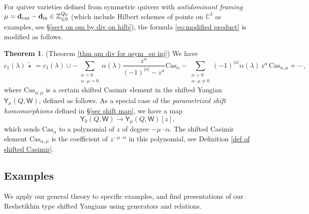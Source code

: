 \documentclass[10pt]{amsart}
\theoremstyle{definition}
\newtheorem{Theorem}{Theorem}[section]
\numberwithin{equation}{section}
\newcommand{\C}{\mathbb{C}}
\newcommand{\bZ}{\mathbb{Z}}
\newcommand{\sW}{\mathsf{W}}
\begin{document}
For quiver varieties defined from symmetric quivers with \textit{antidominant framing} 
$\mu =\mathbf{d}_\textup{out} - \mathbf{d}_\textup{in}\in \bZ_{\leqslant 0}^{Q_0}$ (which include Hilbert schemes of points on $\C^3$ as examples, see \S \ref{sect on qm by div on hilb}), the formula 
\eqref{eq:modified product} is modified as follows.
%
%
\begin{Theorem}(Theorem \ref{thm qm div for asym_sp inj}) 
We have 
\begin{equation}
c_1(\lambda)\,\widetilde{\star}\,  =c_1(\lambda)\cup 
-\sum_{\substack{\alpha>0\\ \alpha\cdot
    \mu=0}}\alpha(\lambda)\frac{z^\alpha}{(-1)^{|\alpha|}-z^\alpha}\mathrm{Cas}_\alpha
-\sum_{\substack{\alpha>0\\ \alpha\cdot \mu\neq 0}}(-1)^{|\alpha|}\alpha(\lambda)\,z^\alpha\,\mathrm{Cas}_{\alpha,\mu}
+\cdots
\,,\label{eq:modified product2}
\end{equation}
%
where $\mathrm{Cas}_{\alpha,\mu}$ is a certain shifted Casimir element
in the shifted Yangian $\mathsf Y_\mu(Q,\sW)$, defined as follows. 
As a special case of the \emph{parametrized shift homomorphisms} defined
in \S \ref{sec shift map}, we have a map
$$
\mathsf Y_0(Q,\sW)\to \mathsf Y_\mu(Q,\sW)[z],
$$
which sends $\mathrm{Cas}_\alpha$ to a polynomial of $z$ of degree
$-\mu \cdot \alpha$. The shifted Casimir element
$\mathrm{Cas}_{\alpha,\mu}$ is the
coefficient of $z^{-\mu \cdot \alpha}$ in this polynomial, see
Definition \ref{def of shifted Casimir}.

\end{Theorem}


 


\subsection{Examples}

We apply our general theory to specific examples, and find presentations of our Reshetikhin type shifted Yangians using generators and relations. 
\end{document}
